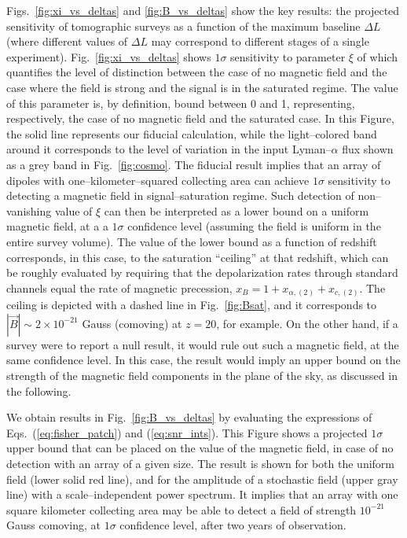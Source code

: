 Figs.~\ref{fig:xi_vs_deltas} and \ref{fig:B_vs_deltas} show the key results: the projected sensitivity of tomographic surveys as a function of the maximum baseline $\Delta L$ (where different values of $\Delta L$ may correspond to different stages of a single experiment). Fig.~\ref{fig:xi_vs_deltas} shows $1\sigma$ sensitivity to parameter $\xi$ of \eq{\ref{eq:saturated_P}} which quantifies the level of distinction between the case of no magnetic field and the case where the field is strong and the signal is in the saturated regime. The value of this parameter is, by definition, bound between 0 and 1, representing, respectively, the case of no magnetic field and the saturated case. In this Figure, the solid line represents our fiducial calculation, while the light--colored band around it corresponds to the level of variation in the input Lyman--$\alpha$ flux shown as a grey band in Fig.~\ref{fig:cosmo}. The fiducial result implies that an array of dipoles with one--kilometer--squared collecting area can achieve $1\sigma$ sensitivity to detecting a magnetic field in signal--saturation regime. Such detection of non--vanishing value of $\xi$ can then be interpreted as a lower bound on a uniform magnetic field, at a a $1\sigma$ confidence level (assuming the field is uniform in the entire survey volume). The value of the lower bound as a function of redshift  corresponds, in this case, to the saturation ``ceiling'' at that redshift, which can be roughly evaluated by requiring that the depolarization rates through standard channels equal the rate of magnetic precession, $x_B = 1+x_{\alpha ,(2)} +x_{c,(2)}$. The ceiling is depicted with a dashed line in Fig.~\ref{fig:Bsat}, and it corresponds to $|\vec B|\sim 2\times 10^{-21}$ Gauss (comoving) at $z=20$, for example.  On the other hand, if a survey were to report a null result, it would rule out such a magnetic field, at the same confidence level. In this case, the result would imply an upper bound on the strength of the magnetic field components in the plane of the sky, as discussed in the following. 

We obtain results in Fig.~\ref{fig:B_vs_deltas} by evaluating the expressions of Eqs.~(\ref{eq:fisher_patch}) and (\ref{eq:snr_ints}). This Figure shows a projected $1\sigma$ upper bound that can be placed on the value of the magnetic field, in case of no detection with an array of a given size. The result is shown for both the uniform field (lower solid red line), and for the amplitude of a stochastic field (upper gray line) with a scale--independent power spectrum. It implies that an array with one square kilometer collecting area may be able to detect a field of strength $10^{-21}$ Gauss comoving, at $1\sigma$ confidence level, after two years of observation.

